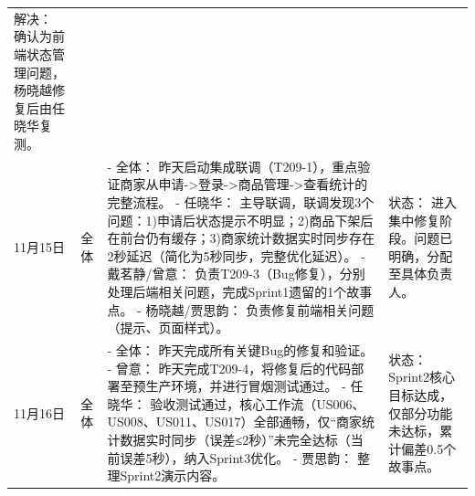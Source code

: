\begin{levellist}
\begin{longtable}{>{\centering\arraybackslash}m{1cm} >{\centering\arraybackslash}m{1cm} >{\centering\arraybackslash}m{9cm} >{\centering\arraybackslash}m{2.5cm}}
        解决： 确认为前端状态管理问题，杨晓越修复后由任晓华复测。                                                                                                                                                                                 \\
        11月15日                                                  & 全体                                                     & - 全体： 昨天启动集成联调（T209-1），重点验证商家从申请->登录->商品管理->查看统计的完整流程。 \newline
        - 任晓华： 主导联调，联调发现3个问题：1)申请后状态提示不明显；2)商品下架后在前台仍有缓存；3)商家统计数据实时同步存在2秒延迟（简化为5秒同步，完整优化延迟）。 \newline
        - 戴茗静/曾意： 负责T209-3（Bug修复），分别处理后端相关问题，完成Sprint1遗留的1个故事点。 \newline
        - 杨晓越/贾思韵： 负责修复前端相关问题（提示、页面样式）。                         & 状态： 进入集中修复阶段。问题已明确，分配至具体负责人。                                                                                                                        \\
        11月16日                                                  & 全体                                                     & - 全体： 昨天完成所有关键Bug的修复和验证。 \newline
        - 曾意： 昨天完成T209-4，将修复后的代码部署至预生产环境，并进行冒烟测试通过。 \newline
        - 任晓华： 验收测试通过，核心工作流（US006、US008、US011、US017）全部通畅，仅“商家统计数据实时同步（误差≤2秒）”未完全达标（当前误差5秒），纳入Sprint3优化。\newline
        - 贾思韵： 整理Sprint2演示内容。                                   & 状态：Sprint2核心目标达成，仅部分功能未达标，累计偏差0.5个故事点。                                                                                                              \\
    \end{longtable}


\end{levellist}
